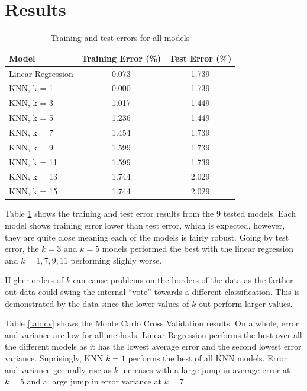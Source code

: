 \documentclass[12pt,letterpaper]{article}
\begin{document}
\section*{Results}

\begin{table}[h]
  \centering
  \begin{tabular}{|l|c|c|}
    \hline
    Model & Training Error (\%) & Test Error (\%) \\ \hline \hline
    Linear Regression & 0.073 & 1.739 \\ \hline
    KNN, k = 1 & 0.000 & 1.739 \\ \hline
    KNN, k = 3 & 1.017 & 1.449 \\ \hline
    KNN, k = 5 & 1.236 & 1.449 \\ \hline
    KNN, k = 7 & 1.454 & 1.739 \\ \hline
    KNN, k = 9 & 1.599 & 1.739 \\ \hline
    KNN, k = 11 & 1.599 & 1.739 \\ \hline
    KNN, k = 13 & 1.744 & 2.029 \\ \hline
    KNN, k = 15 & 1.744 & 2.029 \\ \hline
  \end{tabular}
  \caption{Training and test errors for all models}
  \label{tab:results}
\end{table}

Table \ref{tab:results} shows the training and test error results from the 9 tested models. Each model shows training error lower than test error, which is expected, however, they are quite close meaning each of the models is fairly robust. Going by test error, the $k = 3$ and $k = 5$ models performed the best with the linear regression and $k = {1, 7, 9, 11}$ performing slighly worse.

Higher orders of $k$ can cause problems on the borders of the data as the farther out data could swing the internal ``vote'' towards a different classification. This is demonstrated by the data since the lower values of $k$ out perform larger values. 

Table \ref{tab:cv} shows the Monte Carlo Cross Validation results. On a whole, error and variance are low for all methods. Linear Regression performs the best over all the different models as it has the lowest average error and the second lowest error variance. Suprisingly, KNN $k=1$ performs the best of all KNN models. Error and variance geenrally rise as $k$ increases with a large jump in average error at $k=5$ and a large jump in error variance at $k=7$. 
\end{document}
